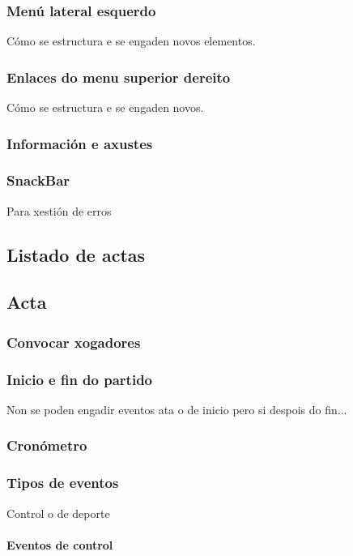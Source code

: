       \subsubsection{Menú lateral esquerdo}
      Cómo se estructura e se engaden novos elementos.

      \subsubsection{Enlaces do menu superior dereito}
      Cómo se estructura e se engaden novos.

      \subsubsection{Información e axustes}

      \subsubsection{SnackBar}
      Para xestión de erros

    \subsection{Listado de actas}


    \subsection{Acta}

      \subsubsection{Convocar xogadores}

      \subsubsection{Inicio e fin do partido}
      Non se poden engadir eventos ata o de inicio pero si despois do fin...

      \subsubsection{Cronómetro}

      \subsubsection{Tipos de eventos}
    Control o de deporte
      \paragraph{Eventos de control}
